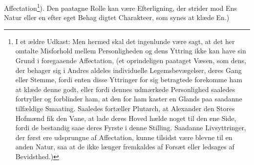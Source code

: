 \documentclass[12pt]{article}
\newcommand{\opage}[1]{\marginnote{\footnotesize\textit{[#1]}}}
\begin{document}
Affectation\footnote{I et ældre Udkast: Men hermed skal det ingenlunde være sagt, at det her omtalte Misforhold mellem Personligheden og dens Yttring ikke kan have sin Grund i foregaaende Affectation, (et oprindeligen paataget Væsen, som dens, der behager sig i Andres aldeles individuelle Legemsbevægelser, deres Gang eller Stemme, fordi enten disse Yttringer for sig betragtede forekomme ham at klæde denne godt, eller fordi dennes udmærkede Personlighed saaledes fortryller og forblinder ham, at den for ham kaster en Glands paa saadanne tilfældige Smaating. Saaledes fortæller Plutarch, at Alexander den Stores Hofmænd fik den Vane, at lade deres Hoved hælde noget til den ene Side, fordi de bestandig saae deres Fyrste i denne Stilling. Saadanne Livsyttringer, der først ere udsprungne af Affectation, kunne tilsidst være blevne til en anden Natur, saa at de ikke længer fremkaldes af Forsæt eller ledsages af Bevidsthed.)}). Den paatagne Rolle kan være Efterligning, der \opage{169}strider mod Ens Natur eller en efter eget Behag digtet Charakteer, som synes at klæde En.)
\end{document}
